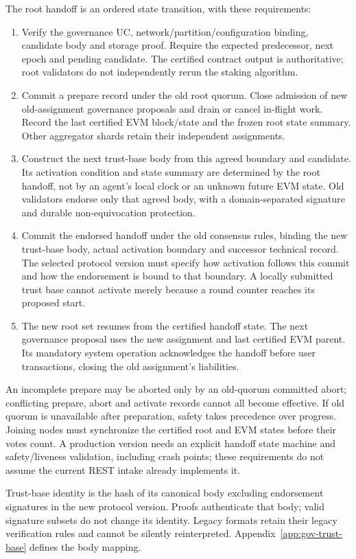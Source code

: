 The root handoff is an ordered state transition, with these requirements:
\begin{enumerate}
 \item Verify the governance UC, network/partition/configuration binding, candidate body and storage proof. Require the expected predecessor, next epoch and pending candidate. The certified contract output is authoritative; root validators do not independently rerun the staking algorithm.
 \item Commit a prepare record under the old root quorum. Close admission of new old-assignment governance proposals and drain or cancel in-flight work. Record the last certified EVM block/state and the frozen root state summary. Other aggregator shards retain their independent assignments.
 \item Construct the next trust-base body from this agreed boundary and candidate. Its activation condition and state summary are determined by the root handoff, not by an agent's local clock or an unknown future EVM state. Old validators endorse only that agreed body, with a domain-separated signature and durable non-equivocation protection.
 \item Commit the endorsed handoff under the old consensus rules, binding the new trust-base body, actual activation boundary and successor technical record. The selected protocol version must specify how activation follows this commit and how the endorsement is bound to that boundary. A locally submitted trust base cannot activate merely because a round counter reaches its proposed start.
 \item The new root set resumes from the certified handoff state. The next governance proposal uses the new assignment and last certified EVM parent. Its mandatory system operation acknowledges the handoff before user transactions, closing the old assignment's liabilities.
\end{enumerate}

An incomplete prepare may be aborted only by an old-quorum committed abort; conflicting prepare, abort and activate records cannot all become effective. If old quorum is unavailable after preparation, safety takes precedence over progress. Joining nodes must synchronize the certified root and EVM states before their votes count. A production version needs an explicit handoff state machine and safety/liveness validation, including crash points; these requirements do not assume the current REST intake already implements it.

Trust-base identity is the hash of its canonical body excluding endorsement signatures in the new protocol version. Proofs authenticate that body; valid signature subsets do not change its identity. Legacy formats retain their legacy verification rules and cannot be silently reinterpreted. Appendix~\ref{app:gov-trust-base} defines the body mapping.

